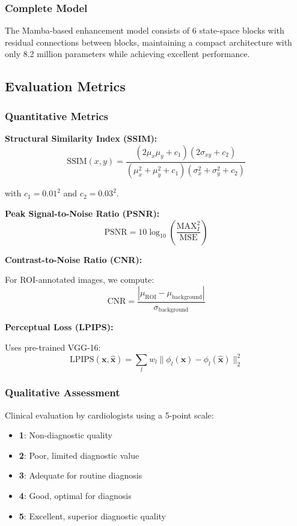 \documentclass[10pt,conference,letterpaper]{IEEEtran}
\begin{document}
\subsubsection{Complete Model}

The Mamba-based enhancement model consists of 6 state-space blocks with residual connections between blocks, maintaining a compact architecture with only 8.2 million parameters while achieving excellent performance.

\subsection{Evaluation Metrics}
\label{subsec:metrics}

\subsubsection{Quantitative Metrics}

\textbf{Structural Similarity Index (SSIM):}
$$\text{SSIM}(x, y) = \frac{(2\mu_x\mu_y + c_1)(2\sigma_{xy} + c_2)}{(\mu_x^2 + \mu_y^2 + c_1)(\sigma_x^2 + \sigma_y^2 + c_2)}$$

with $c_1 = 0.01^2$ and $c_2 = 0.03^2$.

\textbf{Peak Signal-to-Noise Ratio (PSNR):}
$$\text{PSNR} = 10 \log_{10} \left( \frac{\text{MAX}_I^2}{\text{MSE}} \right)$$

\textbf{Contrast-to-Noise Ratio (CNR):}

For ROI-annotated images, we compute:
$$\text{CNR} = \frac{|\mu_{\text{ROI}} - \mu_{\text{background}}|}{\sigma_{\text{background}}}$$

\textbf{Perceptual Loss (LPIPS):}

Uses pre-trained VGG-16:
$$\text{LPIPS}(\mathbf{x}, \hat{\mathbf{x}}) = \sum_l w_l \| \phi_l(\mathbf{x}) - \phi_l(\hat{\mathbf{x}}) \|_2^2$$

\subsubsection{Qualitative Assessment}

Clinical evaluation by cardiologists using a 5-point scale:
\begin{itemize}
  \item \textbf{1}: Non-diagnostic quality
  \item \textbf{2}: Poor, limited diagnostic value
  \item \textbf{3}: Adequate for routine diagnosis
  \item \textbf{4}: Good, optimal for diagnosis
  \item \textbf{5}: Excellent, superior diagnostic quality
\end{itemize}
\end{document}
